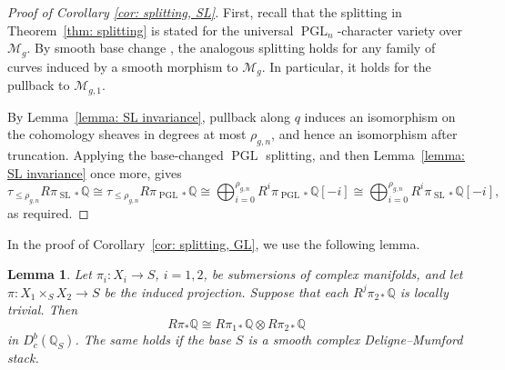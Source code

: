 \documentclass[11pt,reqno]{amsart}
\theoremstyle{plain} %
\newtheorem{lemma}[theorem]{Lemma}
\theoremstyle{definition}
\newcommand{\QQ}{\mathbb{Q}}
\newcommand{\M}{\mathcal{M}}
\DeclareMathOperator{\SL}{SL}
\DeclareMathOperator{\PGL}{PGL}
\begin{document}
\begin{proof}[Proof of Corollary \ref{cor: splitting, SL}]
First, recall that the splitting in Theorem~\ref{thm: splitting} is stated for the universal $\PGL_n$-character variety over $\M_g$. By smooth base change \cite[Theorem 3.2.13(ii)]{Dimca}, the analogous splitting holds for any family of curves induced by a smooth morphism to $\M_g$. In particular, it holds for the pullback to $\M_{g,1}$.

By Lemma~\ref{lemma: SL invariance}, pullback along $q$ induces an isomorphism on the cohomology sheaves in degrees at most $\rho_{g,n}$, and hence an isomorphism after truncation. Applying the base-changed $\PGL$ splitting, and then Lemma~\ref{lemma: SL invariance} once more, gives
\[
\tau_{\le \rho_{g,n}}R\pi_{\SL *}\QQ \cong \tau_{\le \rho_{g,n}}R\pi_{\PGL *}\QQ \cong \bigoplus_{i=0}^{\rho_{g,n}}R^i\pi_{\PGL *}\QQ[-i] \cong \bigoplus_{i=0}^{\rho_{g,n}}R^i\pi_{\SL *}\QQ[-i],
\] as required.
\end{proof}

In the proof of Corollary~\ref{cor: splitting, GL}, we use the following lemma.

\begin{lemma}\label{lemma: smooth relative Künneth}
    Let $\pi_i\colon X_i \to S$, $i=1,2$, be submersions of complex manifolds, and let $\pi\colon X_1 \times_S X_2 \to S$ be the induced projection. Suppose that each $R^j\pi_{2*} \QQ$ is locally trivial. Then $$R\pi_*\QQ \cong R\pi_{1*} \QQ \otimes R\pi_{2*} \QQ$$ in $D^b_c(\QQ_S)$. The same holds if the base $S$ is a smooth complex Deligne--Mumford stack.
\end{lemma}
\end{document}
